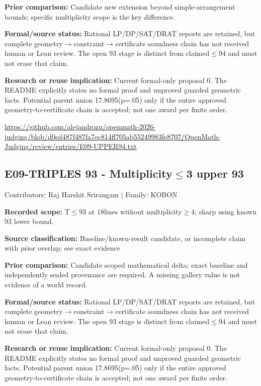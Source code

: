 \documentclass[11pt,a4paper]{article}
\begin{document}
\textbf{Prior comparison:} Candidate new extension beyond simple-arrangement bounds; specific multiplicity scope is the key difference.

\textbf{Formal/source status:} Rational LP/DP/SAT/DRAT reports are retained, but complete geometry\ensuremath{\to}constraint\ensuremath{\to}certificate soundness chain has not received human or Lean review. The open 93 stage is distinct from claimed\ensuremath{\leq}94 and must not erase that claim.

\textbf{Research or reuse implication:} Current formal-only proposal 0. The README explicitly states no formal proof and unproved guarded geometric facts. Potential parent union 17.8695(p=.05) only if the entire approved geometry-to-certificate chain is accepted; not one award per finite order.

{\small \url{https://github.com/alejandrozu/openmath-2026-judging/blob/d0ed487f487fa7ec814ff705ab55249983fe8707/OpenMath-Judging/review/entries/E09-UPPER94.txt}\par}

\begin{samepage}
\subsection{E09-TRIPLES 93  -  Multiplicity\ensuremath{\leq}3 upper 93}
{\small Contributors: Raj Harshit Srirangam | Family: KOBON\par}

\textbf{Recorded scope:} T\ensuremath{\leq}93 at 18lines without multiplicity\ensuremath{\geq}4; sharp using known 93 lower bound.

\end{samepage}
\textbf{Source classification:} Baseline/known-result candidate, or incomplete claim with prior overlap; see exact evidence

\textbf{Prior comparison:} Candidate scoped mathematical delta; exact baseline and independently sealed provenance are required. A missing gallery value is not evidence of a world record.

\textbf{Formal/source status:} Rational LP/DP/SAT/DRAT reports are retained, but complete geometry\ensuremath{\to}constraint\ensuremath{\to}certificate soundness chain has not received human or Lean review. The open 93 stage is distinct from claimed\ensuremath{\leq}94 and must not erase that claim.

\textbf{Research or reuse implication:} Current formal-only proposal 0. The README explicitly states no formal proof and unproved guarded geometric facts. Potential parent union 17.8695(p=.05) only if the entire approved geometry-to-certificate chain is accepted; not one award per finite order.
\end{document}
